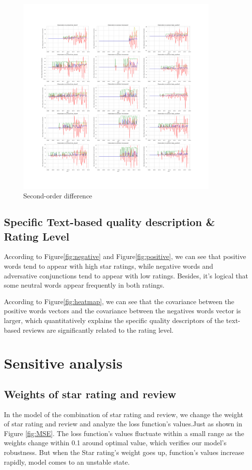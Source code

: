 \documentclass[12pt]{article}  %
\begin{document}
\begin{figure}[!htbp]
\centering
\includegraphics[width=0.9\textwidth]{2_D_diff_2.png}
\caption{Second-order difference}\label{Second-order difference}
\end{figure}

\subsection{Specific Text-based quality description \& Rating Level}
According to Figure\ref{fig:negative} and Figure\ref{fig:positive}, we can see that positive words  tend to appear with high star ratings, while negative words and adversative conjunctions tend to appear with low ratings. Besides, it's logical that some neutral words appear frequently in both ratings. 

According to Figure\ref{fig:heatmap}, we can see that the covariance between the positive words vectors and the covariance between the negatives words vector is larger, which quantitatively explains the specific quality descriptors of the text-based reviews are significantly related to the rating level.


\section{Sensitive analysis}

\subsection{Weights of star rating and review}
In the model of the combination of star rating and review, we change the weight of star rating and review and analyze the loss function's values.Just as shown in Figure \ref{fig:MSE}. The loss function's values fluctuate within a small range  as the weights change within 0.1 around optimal value, which verifies our model's robustness. But when the Star rating's weight goes up, function's values increase rapidly, model comes to an unstable state.
\end{document}
